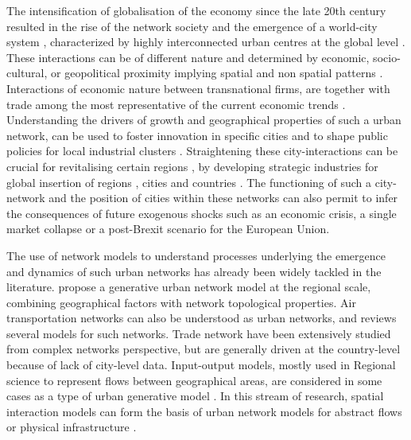 \documentclass[11pt]{article}
\begin{document}
The intensification of globalisation of the economy since the late 20th century resulted in the rise of the network society \cite{castells2000networksociety} and the emergence of a world-city system \cite{taylor2001specification}, characterized by highly interconnected urban centres at the global level \cite{sassen1991}. These interactions can be of different nature and determined by economic, socio-cultural, or geopolitical proximity implying spatial and non spatial patterns \cite{martinus2018global}. Interactions of economic nature between transnational firms, are together with trade among the most representative of the current economic trends \cite{taylor2001specification}. Understanding the drivers of growth and geographical properties of such a urban network, can be used to foster innovation in specific cities and to shape public policies for local industrial clusters \cite{turkina2016structure}. Straightening these city-interactions can be crucial for revitalising certain regions \cite{Clarke2018}, by developing strategic industries for global insertion of regions \cite{dawley2019creating}, cities \cite{gluckler2016relational} and countries \cite{martinus2019brokerage}. The functioning of such a city-network and the position of cities within these networks \cite{gluckler2016relational} can also permit to infer the consequences of future exogenous shocks such as an economic crisis, a single market collapse or a post-Brexit scenario for the European Union.

The use of network models to understand processes underlying the emergence and dynamics of such urban networks has already been widely tackled in the literature. \cite{dai2016simulating} propose a generative urban network model at the regional scale, combining geographical factors with network topological properties. Air transportation networks can also be understood as urban networks, and \cite{zanin2013modelling} reviews several models for such networks. Trade network have been extensively studied from complex networks perspective, but are generally driven at the country-level \cite{garlaschelli2005structure} because of lack of city-level data. Input-output models, mostly used in Regional science to represent flows between geographical areas, are considered in some cases as a type of urban generative model \cite{jin1993generation}. In this stream of research, spatial interaction models \cite{dennett2013multilevel} can form the basis of urban network models for abstract flows \cite{dai2016generative} or physical infrastructure \cite{raimbault2020indirect}.
\end{document}
